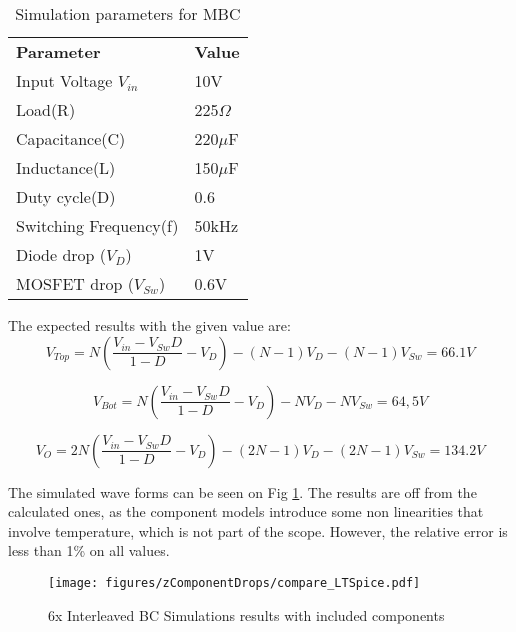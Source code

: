 \begin{table}[H]
\begin{center}
\caption {Simulation parameters for MBC} \label{tab:MBC_2Nx} 
\begin{tabular}{|l|l|}
\cline{1-2}
\textbf{Parameter} & \textbf{Value}  \\ \cline{1-2}
Input Voltage $V_{in}$          &      10V   \\ \cline{1-2}
Load(R)   & 225$\Omega$           \\ \cline{1-2}
Capacitance(C)          &       220$\mu$F     \\ \cline{1-2}
Inductance(L)          &      150$\mu$F      \\ \cline{1-2}
Duty cycle(D)          &     0.6       \\ \cline{1-2}
Switching Frequency(f)          &      50kHz      \\ \cline{1-2}
Diode drop ($V_D$)          &     1V       \\ \cline{1-2}
MOSFET drop ($V_{Sw}$)          &     0.6V       \\ \cline{1-2}
\end{tabular}
\end{center}
\end{table}

The expected results with the given value are: 
\begin{equation}
	V_{Top}= N( \frac{V_{in}-V_{Sw}D}{1-D}-V_D)-(N-1)V_D-(N-1)V_{Sw}= 66.1V
	\label{eq:DROPS_NX_SIM}
\end{equation}

\begin{equation}
	V_{Bot}= N(\frac{V_{in}-V_{Sw}D}{1-D}-V_D)-NV_D-NV_{Sw}= 64,5V
	\label{eq:DROPS_V_BOT_SIM}
\end{equation}

\begin{equation}
	V_{O}=2N(\frac{V_{in}-V_{Sw}D}{1-D}-V_D)-(2N-1)V_D-(2N-1)V_{Sw}= 134.2V
	\label{eq:DROPS_2INX_FINAL_SIM}
\end{equation}


The simulated wave forms can be seen on Fig \ref{fig:MBC_2NxSimResult_DROPS}. The results are off from the calculated ones, as the component models introduce some non linearities that involve temperature, which is not part of the scope. However, the relative error is less than 1\% on all values. 

\begin{figure}[H]
   \centering
   \texttt{[image: figures/zComponentDrops/compare\_LTSpice.pdf]}
    \caption{6x Interleaved BC Simulations results with included components}
	\label{fig:MBC_2NxSimResult_DROPS}
\end{figure}

